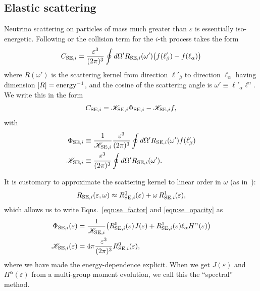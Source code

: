 \documentclass[aps,floatfix,prd,superscriptaddress,twocolumn]{revtex4-1}
\newcommand{\todo}[1]{\marginpar{\tiny{\textcolor{red}{#1}}}}
\begin{document}
\subsection{Elastic scattering}
\label{ssec:sources_se}
Neutrino scattering on particles of mass much greater than $\varepsilon$
is essentially iso-energetic. Following 
\cite[Eqn.~A8]{brue1985-core_collapse} or
\cite[Eqn.~4.20]{shib2011-truncated_moment} the collision term for the
$i$-th process takes the form
\begin{equation}
  \label{eqn:integral_se}
  C_{{\rm SE},i}
  = \frac{\varepsilon^3}{(2\pi)^3}
  \oint d\Omega' R_{{\rm SE},i}(\omega')
  \big(f(\ell'_\beta) - f(\ell_\alpha)\big)
\end{equation}
where $R(\omega')$ is the scattering kernel from direction $\ell'_\beta$
to direction $\ell_\alpha$ having dimension $[R]={\rm energy}^{-1}$,
and the cosine of the scattering angle is
$\omega' \equiv \ell'_\alpha \ell^\alpha$.
We write this in the form
\begin{equation}
  \label{eqn:sources_se}
  C_{{\rm SE},i}
  = \mathscr{K}_{{\rm SE},i} \Phi_{{\rm SE},i} - \mathscr{K}_{{\rm SE},i} f,
\end{equation}
with
\begin{align}
  \label{eqn:se_factor}
  \Phi_{{\rm SE},i} &\equiv
  \frac{1}{\mathscr{K}_{{\rm SE},i}}
  \frac{\varepsilon^3}{(2\pi)^3}
  \oint d\Omega' R_{{\rm SE},i}(\omega')f(\ell'_\beta) \\
  \label{eqn:se_opacity}
  \mathscr{K}_{{\rm SE},i} &\equiv
  \frac{\varepsilon^3}{(2\pi)^3}
  \oint d\Omega' R_{{\rm SE},i}(\omega').
\end{align}

It is customary to approximate the scattering kernel to linear order in
$\omega$ (as in~\cite[Eqn.~4.21]{shib2011-truncated_moment}):
\begin{equation}
  \label{eqn:se_kernel_expansion}
  R_{{\rm SE},i}(\varepsilon,\omega) \approx
  R_{{\rm SE},i}^0(\varepsilon) + \omega \, R_{{\rm SE},i}^1(\varepsilon),
\end{equation}
which allows us to write Eqns.~\ref{eqn:se_factor} and \ref{eqn:se_opacity} as
\todo{drop anisotropic term and defend}
\begin{align}
  \label{eqn:se_factor_expansion}
  \Phi_{{\rm SE},i}(\varepsilon) &= \frac{1}{\mathscr{K}_{{\rm SE},i}}
  \big(R_{{\rm SE},i}^0(\varepsilon) J(\varepsilon) +
   R_{{\rm SE},i}^1(\varepsilon) \ell_\alpha H^\alpha(\varepsilon) \big) \\
  \label{eqn:se_opacity_expansion}
  \mathscr{K}_{{\rm SE},i}(\varepsilon) &=
  4\pi \frac{\varepsilon^3}{(2\pi)^3} R_{{\rm SE},i}^0(\varepsilon),
\end{align}
where we have made the energy-dependence explicit.
When we get $J(\varepsilon)$ and $H^\alpha(\varepsilon)$ from a multi-group
moment evolution, we call this the ``spectral'' method.
\end{document}
